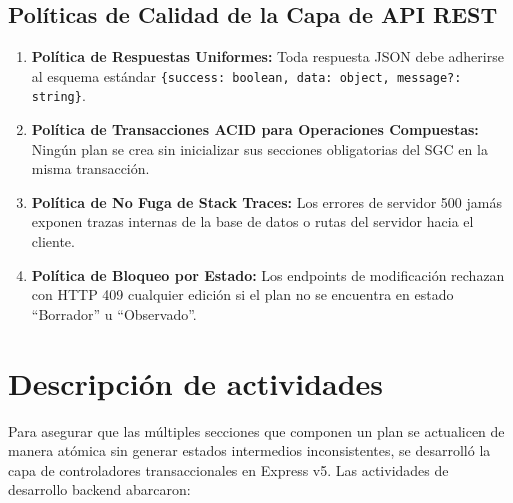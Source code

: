 \documentclass[12pt,a4paper]{article}
\begin{document}
\subsection{Políticas de Calidad de la Capa de API REST}
\begin{enumerate}[leftmargin=1.5em, itemsep=2pt]
    \item \textbf{Política de Respuestas Uniformes:} Toda respuesta JSON debe adherirse al esquema estándar \texttt{\{success: boolean, data: object, message?: string\}}.
    \item \textbf{Política de Transacciones ACID para Operaciones Compuestas:} Ningún plan se crea sin inicializar sus secciones obligatorias del SGC en la misma transacción.
    \item \textbf{Política de No Fuga de Stack Traces:} Los errores de servidor 500 jamás exponen trazas internas de la base de datos o rutas del servidor hacia el cliente.
    \item \textbf{Política de Bloqueo por Estado:} Los endpoints de modificación rechazan con HTTP 409 cualquier edición si el plan no se encuentra en estado ``Borrador'' u ``Observado''.
\end{enumerate}

\section{Descripción de actividades}
Para asegurar que las múltiples secciones que componen un plan se actualicen de manera atómica sin generar estados intermedios inconsistentes, se desarrolló la capa de controladores transaccionales en Express v5. Las actividades de desarrollo backend abarcaron:
\end{document}
